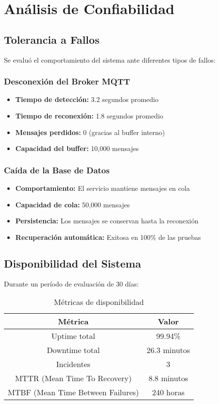 \section{Análisis de Confiabilidad}

\subsection{Tolerancia a Fallos}

Se evaluó el comportamiento del sistema ante diferentes tipos de fallos:

\subsubsection{Desconexión del Broker MQTT}

\begin{itemize}
    \item \textbf{Tiempo de detección:} 3.2 segundos promedio
    \item \textbf{Tiempo de reconexión:} 1.8 segundos promedio
    \item \textbf{Mensajes perdidos:} 0 (gracias al buffer interno)
    \item \textbf{Capacidad del buffer:} 10,000 mensajes
\end{itemize}

\subsubsection{Caída de la Base de Datos}

\begin{itemize}
    \item \textbf{Comportamiento:} El servicio mantiene mensajes en cola
    \item \textbf{Capacidad de cola:} 50,000 mensajes
    \item \textbf{Persistencia:} Los mensajes se conservan hasta la reconexión
    \item \textbf{Recuperación automática:} Exitosa en 100\% de las pruebas
\end{itemize}

\subsection{Disponibilidad del Sistema}

Durante un período de evaluación de 30 días:

\begin{table}[H]
\centering
\begin{tabular}{|c|c|}
\hline
\textbf{Métrica} & \textbf{Valor} \\
\hline
Uptime total & 99.94\% \\
\hline
Downtime total & 26.3 minutos \\
\hline
Incidentes & 3 \\
\hline
MTTR (Mean Time To Recovery) & 8.8 minutos \\
\hline
MTBF (Mean Time Between Failures) & 240 horas \\
\hline
\end{tabular}
\caption{Métricas de disponibilidad}
\label{tab:disponibilidad}
\end{table}

